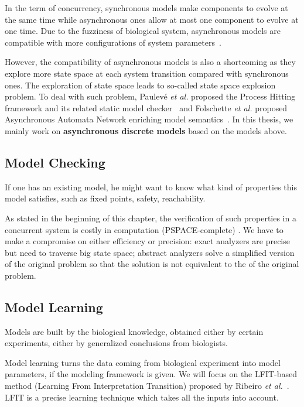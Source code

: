 In the term of concurrency, synchronous models make components to evolve at the same time while asynchronous ones allow at most one component to evolve at one time.
Due to the fuzziness of biological system, asynchronous models are compatible with more configurations of system parameters~\cite{bernot2009}.

However, the compatibility of asynchronous models is also a shortcoming as they explore more state space at each system transition compared with synchronous ones.
The exploration of state space leads to so-called state space explosion problem.
To deal with such problem, Paulev\'e \textit{et al.} proposed the Process Hitting framework and its related static model checker~\cite{pauleve2012} and Folschette \textit{et al.} proposed Asynchronous Automata Network enriching model semantics~\cite{folschette2015}.
In this thesis, we mainly work on \textbf{asynchronous discrete models} based on the models above.

\subsection{Model Checking}
If one has an existing model, he might want to know what kind of properties this model satisfies, such as fixed points, safety, reachability.

As stated in the beginning of this chapter, the verification of such properties in a concurrent system is costly in computation (PSPACE-complete) \cite{harel2002complexity}.
We have to make a compromise on either efficiency or precision: exact analyzers are precise but need to traverse big state space; abstract analyzers solve a simplified version of the original problem so that the solution is not equivalent to the  of the original problem.

\subsection{Model Learning}
Models are built by the biological knowledge, obtained either by certain experiments, either by generalized conclusions from biologists.

Model learning turns the data coming from biological experiment into model parameters, if the modeling framework is given.
We will focus on the LFIT-based method (Learning From Interpretation Transition) proposed by Ribeiro \textit{et al.}~\cite{ribeiro2015learning,ribeiro2018learning,ribeiro2017inductive}.
LFIT is a precise learning technique which takes all the inputs into account.

